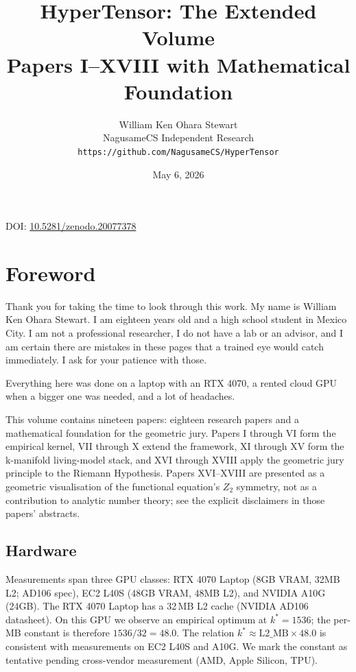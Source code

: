 \documentclass[11pt]{article}
\begin{document}
\title{HyperTensor: The Extended Volume\\\large Papers I--XVIII with Mathematical Foundation}
\author{William Ken Ohara Stewart\\NagusameCS Independent Research\\\texttt{https://github.com/NagusameCS/HyperTensor}}
\date{May 6, 2026}
\maketitle

\begin{center}\small DOI: \href{https://doi.org/10.5281/zenodo.20077378}{10.5281/zenodo.20077378}\end{center}

\section*{Foreword}

Thank you for taking the time to look through this work. My name is William Ken Ohara Stewart. I am eighteen years old and a high school student in Mexico City. I am not a professional researcher, I do not have a lab or an advisor, and I am certain there are mistakes in these pages that a trained eye would catch immediately. I ask for your patience with those.

Everything here was done on a laptop with an RTX 4070, a rented cloud GPU when a bigger one was needed, and a lot of headaches.

This volume contains nineteen papers: eighteen research papers and a mathematical foundation for the geometric jury. Papers I through VI form the empirical kernel, VII through X extend the framework, XI through XV form the k-manifold living-model stack, and XVI through XVIII apply the geometric jury principle to the Riemann Hypothesis. Papers XVI--XVIII are presented as a geometric visualisation of the functional equation's $Z_2$ symmetry, not as a contribution to analytic number theory; see the explicit disclaimers in those papers' abstracts.

\subsection*{Hardware}
Measurements span three GPU classes: RTX 4070 Laptop (8GB VRAM, 32MB L2; AD106 spec), EC2 L40S (48GB VRAM, 48MB L2), and NVIDIA A10G (24GB). The RTX 4070 Laptop has a 32\,MB L2 cache (NVIDIA AD106 datasheet). On this GPU we observe an empirical optimum at $k^* = 1536$; the per-MB constant is therefore $1536/32 = 48.0$. The relation $k^* \approx \mathrm{L2\_MB} \times 48.0$ is consistent with measurements on EC2 L40S and A10G. We mark the constant as tentative pending cross-vendor measurement (AMD, Apple Silicon, TPU).
\end{document}
